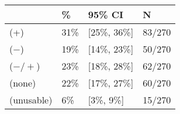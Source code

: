 \begin{tabular}{llll}
\hline
& \% & 95\% CI  & N \\
\hline
(+) & 31\% & [25\%, 36\%] & 83/270\\
($-$) & 19\% & [14\%, 23\%] & 50/270\\
($-/+$) & 23\% & [18\%, 28\%] & 62/270\\
(none) & 22\% & [17\%, 27\%] & 60/270\\
(unusable) & 6\% & [3\%, 9\%] & 15/270\\
\hline
\end{tabular}
